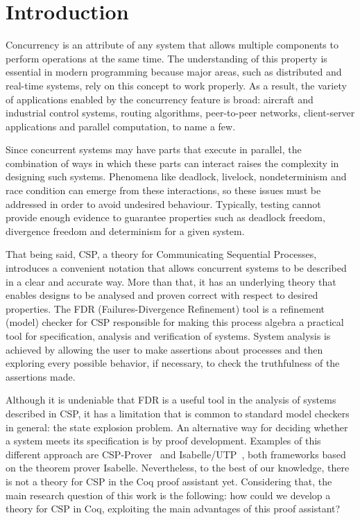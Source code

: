 \chapter{Introduction}

Concurrency is an attribute of any system that allows multiple components to perform operations at the same time. The understanding of this property is essential in modern programming because major areas, such as distributed and real-time systems, rely on this concept to work properly. As a result, the variety of applications enabled by the concurrency feature is broad: aircraft and industrial control systems, routing algorithms, peer-to-peer networks, client-server applications and parallel computation, to name a few.

Since concurrent systems may have parts that execute in parallel, the combination of ways in which these parts can interact raises the complexity in designing such systems. Phenomena like deadlock, livelock, nondeterminism and race condition can emerge from these interactions, so these issues must be addressed in order to avoid undesired behaviour. Typically, testing cannot provide enough evidence to guarantee properties such as deadlock freedom, divergence freedom and determinism for a given system.

That being said, CSP, a theory for Communicating Sequential Processes, introduces a convenient notation that allows concurrent systems to be described in a clear and accurate way. More than that, it has an underlying theory that enables designs to be analysed and proven correct with respect to desired properties. The FDR (Failures-Divergence Refinement) tool is a refinement (model) checker for CSP responsible for making this process algebra a practical tool for specification, analysis and verification of systems. System analysis is achieved by allowing the user to make assertions about processes and then exploring every possible behavior, if necessary, to check the truthfulness of the assertions made.

Although it is undeniable that FDR is a useful tool in the analysis of systems described in CSP, it has a limitation that is common to standard model checkers in general: the state explosion problem. An alternative way for deciding whether a system meets its specification is by proof development. Examples of this different approach are CSP-Prover~\cite{Roggenbach:CSP-Prover} and Isabelle/UTP~\cite{Woodcock:Isabelle/UTP}, both frameworks based on the theorem prover Isabelle. Nevertheless, to the best of our knowledge, there is not a theory for CSP in the Coq proof assistant yet. Considering that, the main research question of this work is the following: how could we develop a theory for CSP in Coq, exploiting the main advantages of this proof assistant?

